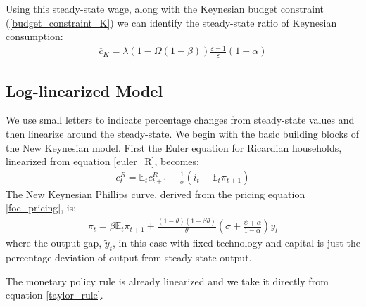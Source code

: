 \documentclass[titlepage]{\econtex}\newcommand{\texname}{ConsumptionHeterogeneity}
\begin{document}
Using this steady-state wage, along with the Keynesian budget constraint (\ref{budget_constraint_K}) we can identify the steady-state ratio of Keynesian consumption:
\begin{align}
\overline{c}_{K} = \lambda \left(1-\Omega(1-\beta)\right)\frac{\varepsilon-1}{\varepsilon}(1-\alpha) \label{c_K_ss}
\end{align}

\subsection{Log-linearized Model}
We use small letters to indicate percentage changes from steady-state values and then linearize around the steady-state. We begin with the basic building blocks of the New Keynesian model. First the Euler equation for Ricardian households, linearized from equation \ref{euler_R}, becomes:
\begin{align}
c^R_t = \mathbb{E}_t c^R_{t+1} - \frac{1}{\sigma}(i_t - \mathbb{E}_t\pi_{t+1}) \label{euler_R_linear}
\end{align}
The New Keynesian Phillips curve, derived from the pricing equation \ref{foc_pricing}, is:
\begin{align}
\pi_t=\beta \mathbb{E}_t\pi_{t+1}+\frac{(1-\theta)(1-\beta\theta)}{\theta}\left(\sigma +  \frac{\psi + \alpha}{1-\alpha} \right)\tilde{y}_t \label{NKphillips_linear}
\end{align}
where the output gap, $\tilde{y}_t$, in this case with fixed technology and capital is just the percentage deviation of output from steady-state output.

The monetary policy rule is already linearized and we take it directly from equation \ref{taylor_rule}.
\end{document}
